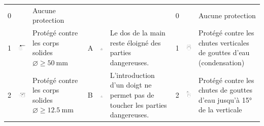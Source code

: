 \begin{xltabular}{\linewidth}{p{0.3cm} m{2cm} X p{0.3cm} m{2cm} X p{0.3cm} m{2.2cm} X}
0 		& 									& Aucune protection	&	&	&	& 0 	&	&	Aucune protection \\
1 		& 	\includegraphics[scale=1.1]{1X.png} & Protégé contre les corps solides $\diameter \geq \SI{50}{\milli\meter}$  	&	A & \includegraphics[width=2cm]{A.png}	&	Le dos de la main reste éloigné des parties dangereuses.	& 1 & 	\includegraphics[scale=1.1]{X1.png}	&	Protégé contre les chutes verticales de gouttes d'eau (condensation) \\
2 		& 	\includegraphics[scale=1.1]{2X.png} & Protégé contre les corps solides $\diameter \geq \SI{12,5}{\milli\meter}$  	& B	& \includegraphics[width=2cm]{B.png}	&	L'introduction d'un doigt ne permet pas de toucher les parties dangereuses. & 2 & 	\includegraphics[scale=1.1]{X2.png}	&	Protégé contre les chutes de gouttes d'eau jusqu'à 15° de la verticale \\

\end{xltabular}
